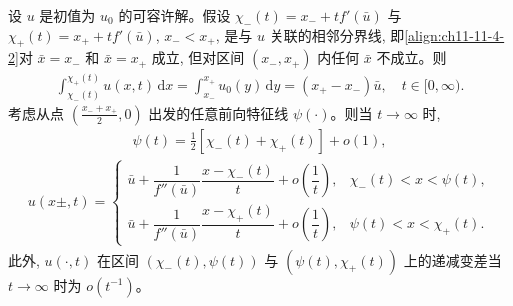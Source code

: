 \documentclass[../../main.tex]{subfiles}
\begin{document}
\begin{theorem}\label{theorem:ch11-11-7-2}
设 $u$ 是初值为 $u_0$ 的可容许解。假设 $\chi_-(t)=x_-+tf'(\bar u)$ 与 $\chi_+(t)=x_++tf'(\bar u)$, $x_-<x_+$, 是与 $u$ 关联的相邻分界线, 即\eqref{align:ch11-11-4-2}对 $\bar x=x_-$ 和 $\bar x=x_+$ 成立, 但对区间 $(x_-,x_+)$ 内任何 $\bar x$ 不成立。则
\begin{align}
\int_{\chi_-(t)}^{\chi_+(t)}u(x,t)\,\mathrm{d}x=\int_{x_-}^{x_+}u_0(y)\,\mathrm{d}y=(x_+-x_-)\bar u,\quad t\in[0,\infty).\label{align:ch11-11-7-2}
\end{align}
考虑从点 $\left(\frac{x_-+x_+}{2},0\right)$ 出发的任意前向特征线 $\psi(\cdot)$。则当 $t\to\infty$ 时,
\begin{align}
\psi(t)=\tfrac12[\chi_-(t)+\chi_+(t)]+o(1),\label{align:ch11-11-7-3}
\end{align}
\begin{align}
u(x\pm,t)=
\begin{cases}
\bar u+\dfrac{1}{f''(\bar u)}\dfrac{x-\chi_-(t)}{t}+o\left(\dfrac1t\right), & \chi_-(t)<x<\psi(t),\\[3mm]
\bar u+\dfrac{1}{f''(\bar u)}\dfrac{x-\chi_+(t)}{t}+o\left(\dfrac1t\right), & \psi(t)<x<\chi_+(t).
\end{cases}\label{align:ch11-11-7-4}
\end{align}
此外, $u(\cdot,t)$ 在区间 $(\chi_-(t),\psi(t))$ 与 $(\psi(t),\chi_+(t))$ 上的递减变差当 $t\to\infty$ 时为 $o(t^{-1})$。
\end{theorem}
\end{document}
